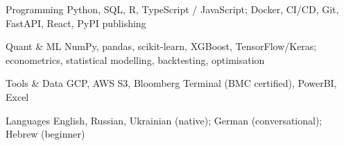

\begin{cvskills}

  \cvskill
    {Programming} %
    {Python, SQL, R, TypeScript / JavaScript; Docker, CI/CD, Git, FastAPI, React, PyPI publishing} %

  \cvskill
    {Quant \& ML} %
    {NumPy, pandas, scikit-learn, XGBoost, TensorFlow/Keras; econometrics, statistical modelling, backtesting, optimisation} %

  \cvskill
    {Tools \& Data} %
    {GCP, AWS S3, Bloomberg Terminal (BMC certified), PowerBI, Excel} %

  \cvskill
    {Languages} %
    {English, Russian, Ukrainian (native); German (conversational); Hebrew (beginner)} %

\end{cvskills}
